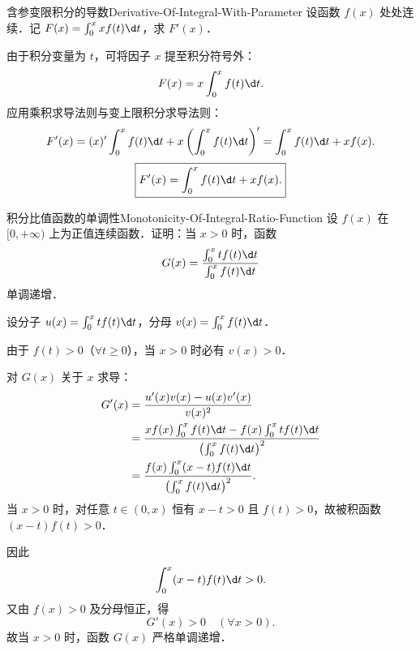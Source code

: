 \begin{problem}{含参变限积分的导数}{Derivative-Of-Integral-With-Parameter}
    设函数 $f(x)$ 处处连续．记 $F(x) = \int_0^x x f(t) \d t$，求 $F'(x)$．
\end{problem}

\begin{solution}
    由于积分变量为 $t$，可将因子 $x$ 提至积分符号外：
    \begin{equation}
        F(x) = x \int_0^x f(t) \d t.
    \end{equation}
    应用乘积求导法则与变上限积分求导法则：
    \begin{equation}
        F'(x) = (x)' \int_0^x f(t) \d t + x \left( \int_0^x f(t) \d t \right)' = \int_0^x f(t) \d t + x f(x).
    \end{equation}
    \begin{equation}
        \boxed{F'(x) = \int_0^x f(t) \d t + x f(x).}
    \end{equation}
\end{solution}

\begin{problem}{积分比值函数的单调性}{Monotonicity-Of-Integral-Ratio-Function}
    设 $f(x)$ 在 $[0, +\infty)$ 上为正值连续函数．证明：当 $x > 0$ 时，函数
    \begin{equation}
        G(x) = \frac{\int_0^x t f(t) \d t}{\int_0^x f(t) \d t}
    \end{equation}
    单调递增．
\end{problem}

\begin{myproof}
    设分子 $u(x) = \int_0^x t f(t) \d t$，分母 $v(x) = \int_0^x f(t) \d t$．

    由于 $f(t) > 0$（$\forall t \geqslant 0$），当 $x > 0$ 时必有 $v(x) > 0$．

    对 $G(x)$ 关于 $x$ 求导：
    \begin{equation}
        \begin{aligned}
            G'(x) & = \frac{u'(x)v(x) - u(x)v'(x)}{v(x)^2}                                                              \\
                  & = \frac{x f(x) \int_0^x f(t) \d t - f(x) \int_0^x t f(t) \d t}{\left( \int_0^x f(t) \d t \right)^2} \\
                  & = \frac{f(x) \int_0^x (x - t) f(t) \d t}{\left( \int_0^x f(t) \d t \right)^2}.
        \end{aligned}
    \end{equation}
    当 $x > 0$ 时，对任意 $t \in (0, x)$ 恒有 $x - t > 0$ 且 $f(t) > 0$，故被积函数 $(x - t)f(t) > 0$．

    因此
    \begin{equation}
        \int_0^x (x - t) f(t) \d t > 0.
    \end{equation}
    又由 $f(x) > 0$ 及分母恒正，得
    \begin{equation}
        G'(x) > 0 \quad (\forall x > 0).
    \end{equation}
    故当 $x > 0$ 时，函数 $G(x)$ 严格单调递增．
\end{myproof}

